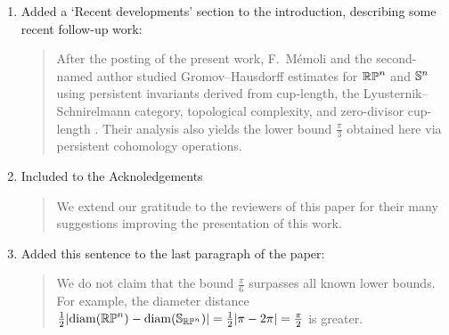 \documentclass{amsart}
\begin{document}
	\begin{enumerate}
		\item Added a `Recent developments' section to the introduction, describing some recent follow-up work:
		\medskip
		\begin{quote}
			After the posting of the present work, F.~M\'emoli and the second-named author studied Gromov--Hausdorff estimates for \(\mathbb{RP}^n\) and \(\mathbb{S}^n\) using persistent invariants derived from cup-length, the Lyusternik--Schnirelmann category, topological complexity, and zero-divisor cup-length \cite{memoli2025persistence}.
			Their analysis also yields the lower bound \(\frac{\pi}{3}\) obtained here via persistent cohomology operations.
		\end{quote}

		\item Included to the Acknoledgements
		\medskip
		\begin{quote}
			We extend our gratitude to the reviewers of this paper for their many suggestions improving the presentation of this work.
		\end{quote}

		\item Added this sentence to the last paragraph of the paper:
		\medskip
		\begin{quote}
			We do not claim that the bound \(\frac{\pi}{6}\) surpasses all known lower bounds.
			For example, the diameter distance \(\frac{1}{2} \lvert \operatorname{diam}(\mathbb{RP}^n) - \operatorname{diam}(\mathbb{S}_{\mathbb{RP}^n}) \rvert = \frac{1}{2} \lvert \pi - 2\pi \rvert = \frac{\pi}{2}\) is greater.
		\end{quote}
	\end{enumerate}
\end{document}

